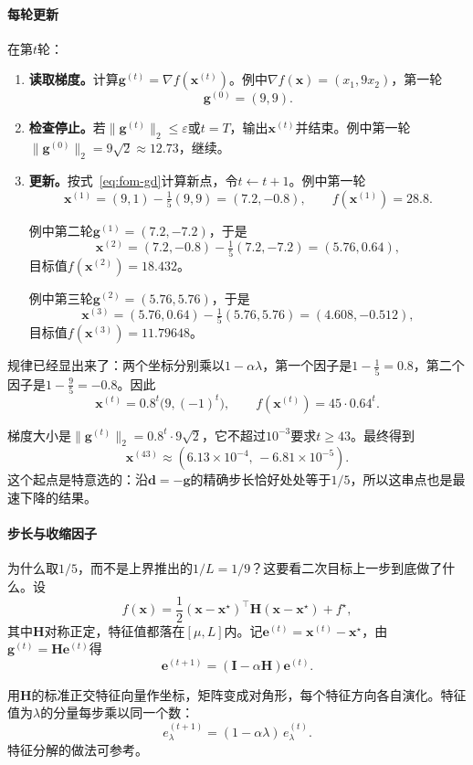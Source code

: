 \paragraph{每轮更新}
在第$t$轮：
\begin{enumerate}
 \item \textbf{读取梯度。}计算$\bm{g}^{(t)}=\nabla f(\bm{x}^{(t)})$。例中$\nabla f(\bm{x})=(x_1,9x_2)$，第一轮
 \[
  \bm{g}^{(0)}=(9,9).
 \]
 \item \textbf{检查停止。}若$\lVert\bm{g}^{(t)}\rVert_2\leq\varepsilon$或$t=T$，输出$\bm{x}^{(t)}$并结束。例中第一轮$\lVert\bm{g}^{(0)}\rVert_2=9\sqrt2\approx12.73$，继续。
 \item \textbf{更新。}按式~\eqref{eq:fom-gd}计算新点，令$t\leftarrow t+1$。例中第一轮
 \[
  \bm{x}^{(1)}=(9,1)-\tfrac15(9,9)=(7.2,-0.8),\qquad f(\bm{x}^{(1)})=28.8.
 \]

 例中第二轮$\bm{g}^{(1)}=(7.2,-7.2)$，于是
 \[
  \bm{x}^{(2)}=(7.2,-0.8)-\tfrac15(7.2,-7.2)=(5.76,0.64),
 \]
 目标值$f(\bm{x}^{(2)})=18.432$。

 例中第三轮$\bm{g}^{(2)}=(5.76,5.76)$，于是
 \[
  \bm{x}^{(3)}=(5.76,0.64)-\tfrac15(5.76,5.76)=(4.608,-0.512),
 \]
 目标值$f(\bm{x}^{(3)})=11.79648$。
\end{enumerate}

规律已经显出来了：两个坐标分别乘以$1-\alpha\lambda$，第一个因子是$1-\tfrac15=0.8$，第二个因子是$1-\tfrac95=-0.8$。因此
\[
 \bm{x}^{(t)}=0.8^t\bigl(9,(-1)^t\bigr),\qquad f(\bm{x}^{(t)})=45\cdot0.64^t.
\]

梯度大小是$\lVert\bm{g}^{(t)}\rVert_2=0.8^t\cdot9\sqrt2$，它不超过$10^{-3}$要求$t\geq43$。最终得到
\[
 \bm{x}^{(43)}\approx(6.13\times10^{-4},\,-6.81\times10^{-5}).
\]
这个起点是特意选的：沿$\bm{d}=-\bm{g}$的精确步长恰好处处等于$1/5$，所以这串点也是最速下降的结果。

\paragraph{步长与收缩因子}
为什么取$1/5$，而不是上界推出的$1/L=1/9$？这要看二次目标上一步到底做了什么。设
\[
 f(\bm{x})=\frac12(\bm{x}-\bm{x}^\star)^\top\bm{H}(\bm{x}-\bm{x}^\star)+f^\star,
\]
其中$\bm{H}$对称正定，特征值都落在$[\mu,L]$内。记$\bm{e}^{(t)}=\bm{x}^{(t)}-\bm{x}^\star$，由$\bm{g}^{(t)}=\bm{H}\bm{e}^{(t)}$得
\[
 \bm{e}^{(t+1)}=(\bm{I}-\alpha\bm{H})\bm{e}^{(t)}.
\]

用$\bm{H}$的标准正交特征向量作坐标，矩阵变成对角形，每个特征方向各自演化。特征值为$\lambda$的分量每步乘以同一个数：
\begin{equation}
 e_\lambda^{(t+1)}=(1-\alpha\lambda)\,e_\lambda^{(t)}.
 \label{eq:fom-gd-factor}
\end{equation}
特征分解的做法可参考。

